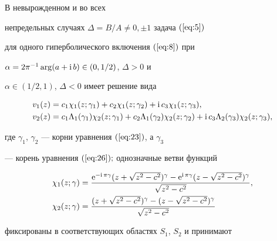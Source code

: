 \begin{thm}


В невырожденном и во всех


непредельных случаях $\Delta=B/A\ne 0,\pm 1$ задача $(\ref{eq:5})$


для одного гиперболического включения $(\ref{eq:8})$ при


$\alpha=2\pi^{-1}\arg(a+\mathrm i\, b)\in (0,1/2)$, $\Delta>0$ и


$\alpha\in (1/2,1)$, $\Delta<0$ имеет решение вида


\begin{equation}


\begin{split}


v_1(z)&=c_1\chi _1(z;\gamma_1)+c_2\chi _1(z;\gamma_2)+


\i c_3\chi _1(z;\gamma_3),\\


v_2(z)&=c_1\Lambda_1(\gamma_1)\chi _2(z;\gamma_1)+


c_2\Lambda_1(\gamma_2)\chi _2(z;\gamma_2)+


\i c_3\Lambda_2(\gamma_3)\chi _2(z;\gamma_3),


\end{split}


\label{eq:30}


\end{equation}


где $\gamma_1$, $\gamma_2$ --- корни уравнения $(\ref{eq:23})$, а $\gamma_3$


--- корень уравнения $(\ref{eq:26});$ однозначные ветви функций


\begin{equation}


\begin{split}


\chi_1(z;\gamma)&=


\frac{\mathrm e^{-\i\pi\gamma}(z+\sqrt{z^2-c^2})^\gamma-


\mathrm e^{\i\pi\gamma}(z-\sqrt{z^2-c^2})^\gamma }{\sqrt{z^2-c^2}},\\


\chi_2(z;\gamma)&=\frac{(z+\sqrt{z^2-c^2})^\gamma-


(z-\sqrt{z^2-c^2})^\gamma }{\sqrt{z^2-c^2}}


\end{split}\label{eq:31}


\end{equation}


фиксированы в соответствующих областях $S_1$, $S_2$ и принимают



\end{thm}
